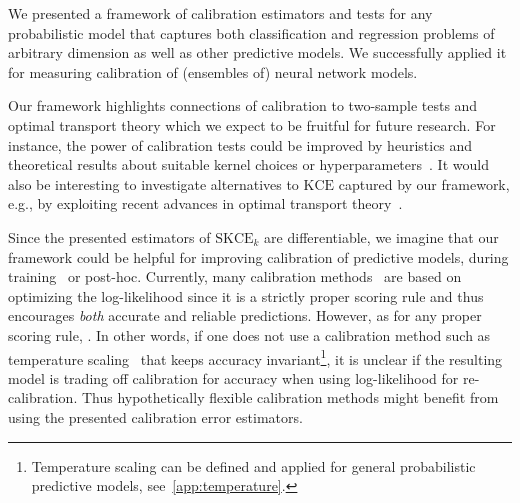 \documentclass{article}
\begin{document}
We presented a framework of calibration estimators and tests for any
probabilistic model that captures both classification and regression
problems of arbitrary dimension
as well as other predictive models.
We successfully applied it
for measuring calibration of (ensembles of) neural network models.

Our framework highlights connections of calibration to two-sample
tests and optimal transport theory which we expect
to be fruitful for future research. For instance, the power of calibration
tests could be improved by heuristics and theoretical results about
suitable kernel choices or hyperparameters~\citep[cf.][]{Jitkrittum2016}.
It would also be interesting to investigate alternatives to $\mathrm{KCE}$
captured by our framework, e.g., by exploiting recent advances in
optimal transport theory~\citep[cf.][]{Genevay2016}.

Since the presented estimators of $\mathrm{SKCE}_k$ are differentiable, we
imagine that our framework could be helpful for improving calibration of
predictive models, during training~\citep[cf.][]{Kumar2018} or post-hoc.
Currently, many calibration
methods~\citep[see, e.g.,][]{Guo2017,Kull2019,Song2019} are based on
optimizing the log-likelihood since it is a strictly proper scoring rule and
thus encourages \emph{both} accurate and reliable predictions. However, as
for any proper scoring rule, . In other words, if one does not
use a calibration method such as temperature scaling~\citep{Guo2017} that
keeps accuracy invariant\footnote{Temperature scaling can be defined
and applied for general probabilistic predictive models, see~\cref{app:temperature}.},
it is unclear if the resulting model is
trading off calibration for accuracy when using log-likelihood for
re-calibration. Thus hypothetically flexible calibration methods might
benefit from using the presented calibration error estimators.

%



\end{document}
